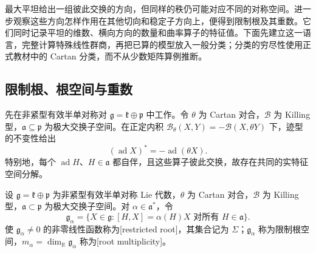 
% 
% 
% 
% 


最大平坦给出一组彼此交换的方向，但同样的秩仍可能对应不同的对称空间。进一步观察这些方向怎样作用在其他切向和稳定子方向上，便得到限制根及其重数。它们同时记录平坦的维数、横向方向的数量和曲率算子的特征值。下面先建立这一语言，完整计算特殊线性群商，再把已算的模型放入一般分类；分类的穷尽性使用正式教材中的 Cartan 分类，而不从少数矩阵算例推断。

\subsection{限制根、根空间与重数}
\label{g3:subsec:0506:01}

先在非紧型有效半单对称对 \(\mathfrak g=\mathfrak k\oplus\mathfrak p\) 中工作。令 \(\theta\) 为 Cartan 对合，\(\mathcal B\) 为 Killing 型，\(\mathfrak a\subseteq\mathfrak p\) 为极大交换子空间。在正定内积 \(\mathcal B_\theta(X,Y)=-\mathcal B(X,\theta Y)\) 下，迹型的不变性给出
\begin{equation}\label{g3:eq:cartan-adjoint-identity}
	(\operatorname{ad}X)^*=-\operatorname{ad}(\theta X).
\end{equation}
特别地，每个 \(\operatorname{ad}H\)、\(H\in\mathfrak a\) 都自伴，且这些算子彼此交换，故存在共同的实特征空间分解。

\begin{definition}\label{g3:def:restricted-root}
	设 \(\mathfrak g=\mathfrak k\oplus\mathfrak p\) 为非紧型有效半单对称 Lie 代数，\(\theta\) 为 Cartan 对合，\(\mathcal B\) 为 Killing 型，\(\mathfrak a\subset\mathfrak p\) 为极大交换子空间。对 \(\alpha\in\mathfrak a^*\)，令
	\[
		\mathfrak g_\alpha
		=\{X\in\mathfrak g:[H,X]=\alpha(H)X\text{ 对所有 }H\in\mathfrak a\}.
	\]
	使 \(\mathfrak g_\alpha\ne0\) 的非零线性函数称为[restricted root]，其集合记为 \(\Sigma\)；\(\mathfrak g_\alpha\) 称为限制根空间，\(m_\alpha=\dim_{\mathbb R}\mathfrak g_\alpha\) 称为[root multiplicity]。
\end{definition}

